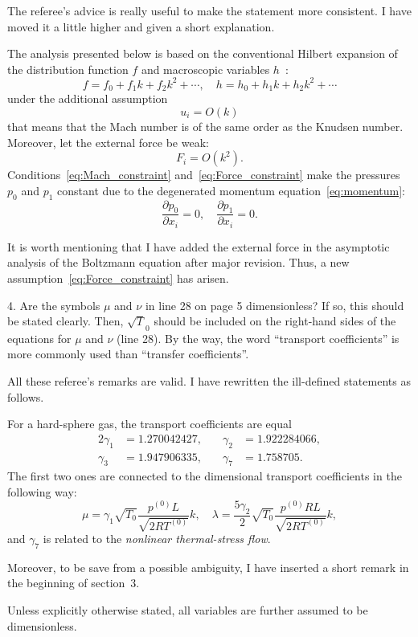\documentclass{article}
\newcommand{\pder}[2][]{\frac{\partial#1}{\partial#2}}
\begin{document}
The referee's advice is really useful to make the statement more consistent.
I have moved it a little higher and given a short explanation.

\begin{leftbar}
The analysis presented below is based on the conventional Hilbert expansion
of the distribution function \(f\) and macroscopic variables \(h\)~\cite{Hilbert1912}:
\[ f = f_0 + f_1k + f_2k^2 + \cdots, \quad h = h_0 + h_1k + h_2k^2 + \cdots \]
under the additional assumption
\begin{equation}\label{eq:Mach_constraint}
	u_i = O(k)
\end{equation}
that means that the Mach number is of the same order as the Knudsen number.
Moreover, let the external force be weak:
\begin{equation}\label{eq:Force_constraint}
	F_i = O(k^2).
\end{equation}
Conditions~\eqref{eq:Mach_constraint} and~\eqref{eq:Force_constraint} make the pressures
\(p_0\) and \(p_1\) constant due to the degenerated momentum equation~\eqref{eq:momentum}:
\begin{equation}
	\pder[p_0]{x_i} = 0, \quad \pder[p_1]{x_i} = 0.
\end{equation}
\end{leftbar}
It is worth mentioning that I have added the external force in the asymptotic analysis of
the Boltzmann equation after major revision.
Thus, a new assumption~\eqref{eq:Force_constraint} has arisen.

\begin{quoting}
4. Are the symbols \(\mu\) and \(\nu\) in line 28 on page 5 dimensionless?
If so, this should be stated clearly. Then, \(\sqrt T_0\) should be
included on the right-hand sides of the equations for \(\mu\) and
\(\nu\) (line 28). By the way, the word ``transport coefficients'' is
more commonly used than ``transfer coefficients''.
\end{quoting}

All these referee's remarks are valid. I have rewritten the ill-defined statements as follows.
\begin{leftbar}
For a hard-sphere gas, the transport coefficients are equal
\begin{alignat*}{2}
	\gamma_1 &= 1.270042427, &\quad \gamma_2 &= 1.922284066, \\
	\gamma_3 &= 1.947906335, &\quad \gamma_7 &= 1.758705.
\end{alignat*}
The first two ones are connected to the dimensional transport coefficients in the following way:
\begin{equation}
	\mu = \gamma_1\sqrt{T_0} \frac{p^{(0)}L}{\sqrt{2RT^{(0)}}} k, \quad
	\lambda = \frac{5\gamma_2}{2}\sqrt{T_0} \frac{p^{(0)}RL}{\sqrt{2RT^{(0)}}} k,
\end{equation}	
and \(\gamma_7\) is related to the \emph{nonlinear thermal-stress flow}.
\end{leftbar}
Moreover, to be save from a possible ambiguity,
I have inserted a short remark in the beginning of section~3.
\begin{leftbar}
Unless explicitly otherwise stated, all variables are further assumed to be dimensionless.
\end{leftbar}
\end{document}
